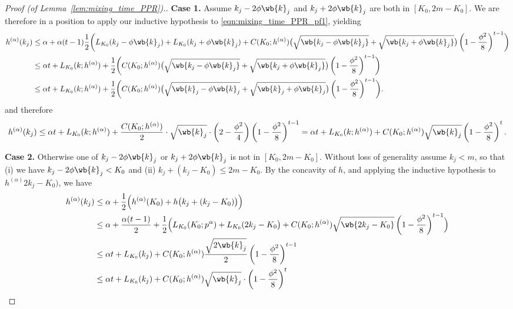 \documentclass{article}
\newcommand{\1}{\mathbf{1}}
\theoremstyle{definition}
\theoremstyle{remark}
\begin{document}
\begin{proof}[Proof (of Lemma~\ref{lem:mixing_time_PPR}).]
	\textbf{Case 1.}
	Assume $k_j - 2 \phi \wb{k}_j$ and $k_j + 2 \phi \wb{k}_j$ are both in $[K_0,2m  - K_0]$. We are therefore in a position to apply our inductive hypothesis to \eqref{eqn:mixing_time_PPR_pf1}, yielding
	\begin{align*}
	h^{(\alpha)}(k_j) & \leq \alpha + \alpha(t-1) \frac{1}{2}\biggl(L_{K_0}(k_j - \phi \wb{k}_j) + L_{K_0}(k_j + \phi \wb{k}_j) + C(K_0;h^{(\alpha)})\bigl(\sqrt{\wb{k_j - \phi \wb{k}_j}} + \sqrt{\wb{k_j + \phi \wb{k}_j}}\bigr)\left(1 - \frac{\phi^2}{8}\right)^{t-1} \biggr) \\
	& \leq \alpha t + L_{K_0}(k;h^{(\alpha)}) + \frac{1}{2}\biggl(C(K_0;h^{(\alpha)})\bigl(\sqrt{\wb{k_j - \phi \wb{k}_j}} + \sqrt{\wb{k_j + \phi \wb{k}_j}}\bigr)\left(1 - \frac{\phi^2}{8}\right)^{t-1} \biggr) \\
	& \leq \alpha t + L_{K_0}(k;h^{(\alpha)}) + \frac{1}{2}\biggl(C(K_0;h^{(\alpha)})\bigl(\sqrt{\wb{k}_j - \phi \wb{k}_j} + \sqrt{\wb{k}_j + \phi \wb{k}_j}\bigr)\left(1 - \frac{\phi^2}{8}\right)^{t-1} \biggr).
	\end{align*}
	and therefore
	\begin{equation*}
	h^{(\alpha)}(k_j) \leq  \alpha t + L_{K_0}(k;h^{(\alpha)}) + \frac{C(K_0;h^{(\alpha)})}{2}\cdot \sqrt{\wb{k}_j}\cdot\left(2 - \frac{\phi^2}{4}\right)\left(1 - \frac{\phi^2}{8}\right)^{t-1} = \alpha t + L_{K_0}(k;h^{(\alpha)}) + C(K_0;h^{(\alpha)})\sqrt{\wb{k}_j}\left(1 - \frac{\phi^2}{8}\right)^{t}.
	\end{equation*}
	
	\textbf{Case 2.} Otherwise one of $k_j - 2 \phi \wb{k}_j$ or $k_j + 2 \phi \wb{k}_j$ is not in $[K_0,2m  - K_0]$. Without loss of generality assume $k_j < m$, so that (i) we have $k_j - 2 \phi \wb{k}_j < K_0$ and (ii) $k_j + (k_j - K_0) \leq 2m - K_0$. By the concavity of $h$, and applying the inductive hypothesis to $h^{(\alpha)}2k_j - K_0)$, we have
	\begin{align*}
	h^{(\alpha)}(k_j) & \leq \alpha + \frac{1}{2}\Bigl(h^{(\alpha)}(K_0) + h\bigl(k_j + (k_j - K_0)\bigr)\Bigr) \\
	& \leq\alpha + \frac{\alpha(t - 1)}{2} + \frac{1}{2}\Bigl(L_{K_0}(K_0;p^{\alpha}) + L_{K_0}(2k_j - K_0\bigr) + C(K_0;h^{(\alpha)})\sqrt{\wb{2k_j - K_0}}\left(1 - \frac{\phi^2}{8}\right)^{t - 1}\Bigr) \\
	& \leq \alpha t + L_{K_0}(k_j) + C(K_0;h^{(\alpha)}) \frac{\sqrt{2\wb{k}_j}}{2} \left(1 - \frac{\phi^2}{8}\right)^{t - 1} \\
	& \leq \alpha t + L_{K_0}(k_j) + C(K_0;h^{(\alpha)}) \sqrt{\wb{k}_j} \cdot \left(1 - \frac{\phi^2}{8}\right)^{t}
	\end{align*}
\end{proof}
\end{document}
